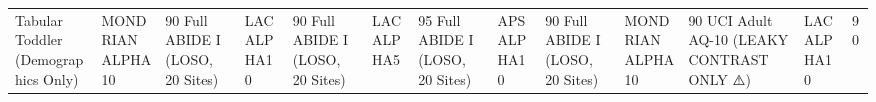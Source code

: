 \begin{table}
\begin{tabular}{lllllllll}
Tabular Toddler (Demographics Only) & MONDRIAN ALPHA10 & 90%
Full ABIDE I (LOSO, 20 Sites) & LAC ALPHA10 & 90%
Full ABIDE I (LOSO, 20 Sites) & LAC ALPHA5 & 95%
Full ABIDE I (LOSO, 20 Sites) & APS ALPHA10 & 90%
Full ABIDE I (LOSO, 20 Sites) & MONDRIAN ALPHA10 & 90%
UCI Adult AQ-10 (LEAKY CONTRAST ONLY ⚠️) & LAC ALPHA10 & 90%
\bottomrule
\end{tabular}
\end{table}
